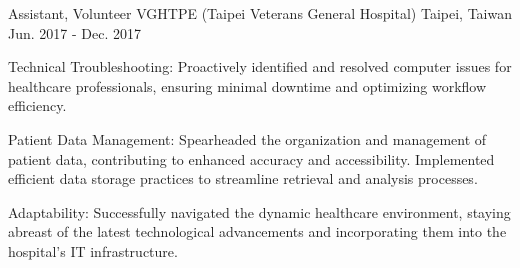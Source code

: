 

\begin{cventries}

  \cventry
    {Assistant, Volunteer} %
    {VGHTPE (Taipei Veterans General Hospital)} %
    {Taipei, Taiwan} %
    {Jun. 2017 - Dec. 2017} %
    {
      \begin{cvitems} %
        \item {Technical Troubleshooting: Proactively identified and resolved computer issues for healthcare professionals, ensuring minimal downtime and optimizing workflow efficiency.}
        \item {Patient Data Management: Spearheaded the organization and management of patient data, contributing to enhanced accuracy and accessibility. Implemented efficient data storage practices to streamline retrieval and analysis processes.}
        \item {Adaptability: Successfully navigated the dynamic healthcare environment, staying abreast of the latest technological advancements and incorporating them into the hospital's IT infrastructure.}
      \end{cvitems}
    }


\end{cventries}
